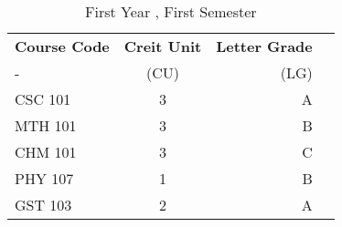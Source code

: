 \documentclass{article}
\begin{document}
	
	\begin{table}[h!]
		\begin{center}
			\caption{First Year , First Semester}
			\label{tab:table}
			\begin{tabular}{l|c|r|c}
				\textbf{Course Code} & \textbf{Creit Unit} &
				\textbf{Letter Grade}\\
				- &(CU) & (LG) \\ 
				\hline
				CSC 101 & 3 & A\\
				MTH 101 & 3 & B\\
				CHM 101 & 3 & C\\
				PHY 107 & 1 & B\\%
				GST 103 & 2 & A\\%
		    \end{tabular}
	     \end{center}
       \end{table}
   
 
\end{document}
